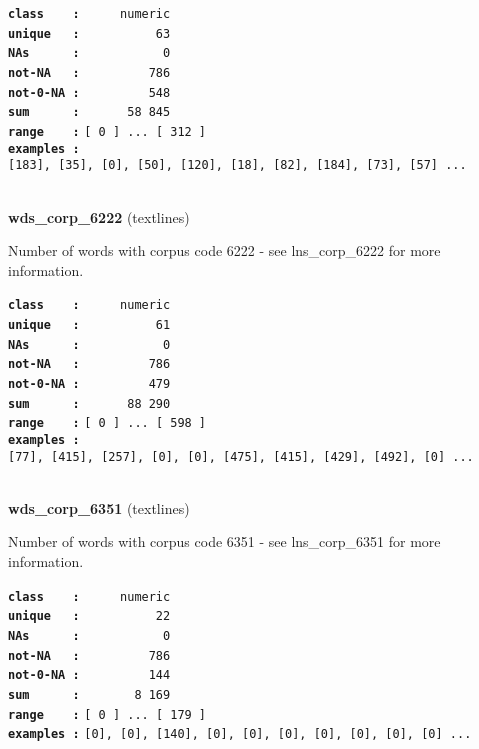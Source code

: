 \documentclass[]{article}
\begin{document}
\textbf{\texttt{class\ \ \ \ :}} \texttt{~~~~~numeric}\\
\textbf{\texttt{unique\ \ \ :}} \texttt{~~~~~~~~~~63}\\
\textbf{\texttt{NAs\ \ \ \ \ \ :}} \texttt{~~~~~~~~~~~0}\\
\textbf{\texttt{not-NA\ \ \ :}} \texttt{~~~~~~~~~786}\\
\textbf{\texttt{not-0-NA\ :}} \texttt{~~~~~~~~~548}\\
\textbf{\texttt{sum\ \ \ \ \ \ :}} \texttt{~~~~~~58~845}\\
\textbf{\texttt{range\ \ \ \ :}}
\texttt{{[}\ 0\ {]}\ ...\ {[}\ 312\ {]}}\\
\textbf{\texttt{examples\ :}}
\texttt{{[}183{]},\ {[}35{]},\ {[}0{]},\ {[}50{]},\ {[}120{]},\ {[}18{]},\ {[}82{]},\ {[}184{]},\ {[}73{]},\ {[}57{]}\ ...}\\

~

\textbf{wds\_corp\_6222} (textlines)

Number of words with corpus code 6222 - see lns\_corp\_6222 for more
information.

\textbf{\texttt{class\ \ \ \ :}} \texttt{~~~~~numeric}\\
\textbf{\texttt{unique\ \ \ :}} \texttt{~~~~~~~~~~61}\\
\textbf{\texttt{NAs\ \ \ \ \ \ :}} \texttt{~~~~~~~~~~~0}\\
\textbf{\texttt{not-NA\ \ \ :}} \texttt{~~~~~~~~~786}\\
\textbf{\texttt{not-0-NA\ :}} \texttt{~~~~~~~~~479}\\
\textbf{\texttt{sum\ \ \ \ \ \ :}} \texttt{~~~~~~88~290}\\
\textbf{\texttt{range\ \ \ \ :}}
\texttt{{[}\ 0\ {]}\ ...\ {[}\ 598\ {]}}\\
\textbf{\texttt{examples\ :}}
\texttt{{[}77{]},\ {[}415{]},\ {[}257{]},\ {[}0{]},\ {[}0{]},\ {[}475{]},\ {[}415{]},\ {[}429{]},\ {[}492{]},\ {[}0{]}\ ...}\\

~

\textbf{wds\_corp\_6351} (textlines)

Number of words with corpus code 6351 - see lns\_corp\_6351 for more
information.

\textbf{\texttt{class\ \ \ \ :}} \texttt{~~~~~numeric}\\
\textbf{\texttt{unique\ \ \ :}} \texttt{~~~~~~~~~~22}\\
\textbf{\texttt{NAs\ \ \ \ \ \ :}} \texttt{~~~~~~~~~~~0}\\
\textbf{\texttt{not-NA\ \ \ :}} \texttt{~~~~~~~~~786}\\
\textbf{\texttt{not-0-NA\ :}} \texttt{~~~~~~~~~144}\\
\textbf{\texttt{sum\ \ \ \ \ \ :}} \texttt{~~~~~~~8~169}\\
\textbf{\texttt{range\ \ \ \ :}}
\texttt{{[}\ 0\ {]}\ ...\ {[}\ 179\ {]}}\\
\textbf{\texttt{examples\ :}}
\texttt{{[}0{]},\ {[}0{]},\ {[}140{]},\ {[}0{]},\ {[}0{]},\ {[}0{]},\ {[}0{]},\ {[}0{]},\ {[}0{]},\ {[}0{]}\ ...}\\
\end{document}
